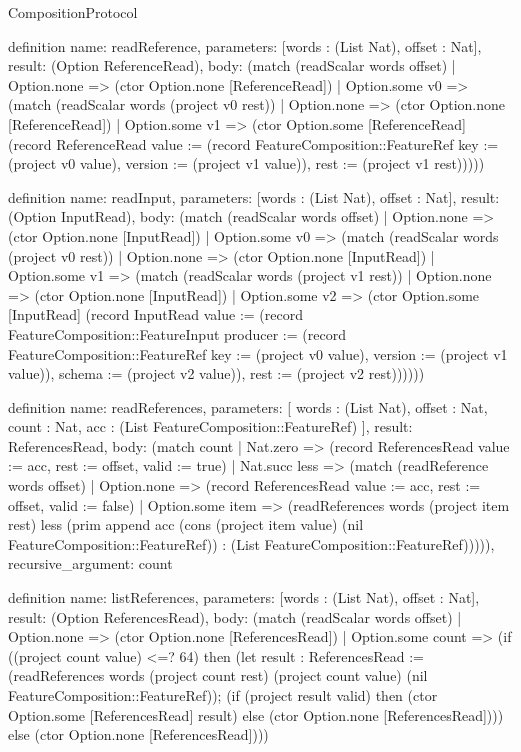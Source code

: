 \begin{lexlean}{CompositionProtocol}
\begin{semanticmodule}
definition{
  name: readReference,
  parameters: [words : (List Nat), offset : Nat],
  result: (Option ReferenceRead),
  body: (match (readScalar words offset)
    | Option.none => (ctor Option.none [ReferenceRead])
    | Option.some v0 => (match (readScalar words (project v0 rest))
      | Option.none => (ctor Option.none [ReferenceRead])
      | Option.some v1 => (ctor Option.some [ReferenceRead] (record ReferenceRead {value := (record FeatureComposition::FeatureRef {key := (project v0 value), version := (project v1 value)}), rest := (project v1 rest)}))))
}

definition{
  name: readInput,
  parameters: [words : (List Nat), offset : Nat],
  result: (Option InputRead),
  body: (match (readScalar words offset)
    | Option.none => (ctor Option.none [InputRead])
    | Option.some v0 => (match (readScalar words (project v0 rest))
      | Option.none => (ctor Option.none [InputRead])
      | Option.some v1 => (match (readScalar words (project v1 rest))
        | Option.none => (ctor Option.none [InputRead])
        | Option.some v2 => (ctor Option.some [InputRead] (record InputRead {value := (record FeatureComposition::FeatureInput {producer := (record FeatureComposition::FeatureRef {key := (project v0 value), version := (project v1 value)}), schema := (project v2 value)}), rest := (project v2 rest)})))))
}

definition{
  name: readReferences,
  parameters: [
    words : (List Nat),
    offset : Nat,
    count : Nat,
    acc : (List FeatureComposition::FeatureRef)
  ],
  result: ReferencesRead,
  body: (match count
    | Nat.zero => (record ReferencesRead {value := acc, rest := offset, valid := true})
    | Nat.succ less => (match (readReference words offset)
      | Option.none => (record ReferencesRead {value := acc, rest := offset, valid := false})
      | Option.some item => (readReferences words (project item rest) less (prim append acc (cons (project item value) (nil FeatureComposition::FeatureRef)) : (List FeatureComposition::FeatureRef))))),
  recursive_argument: count
}

definition{
  name: listReferences,
  parameters: [words : (List Nat), offset : Nat],
  result: (Option ReferencesRead),
  body: (match (readScalar words offset)
    | Option.none => (ctor Option.none [ReferencesRead])
    | Option.some count => (if ((project count value) <=? 64) then (let result : ReferencesRead := (readReferences words (project count rest) (project count value) (nil FeatureComposition::FeatureRef)); (if (project result valid) then (ctor Option.some [ReferencesRead] result) else (ctor Option.none [ReferencesRead]))) else (ctor Option.none [ReferencesRead])))
}


\end{semanticmodule}
\end{lexlean}

